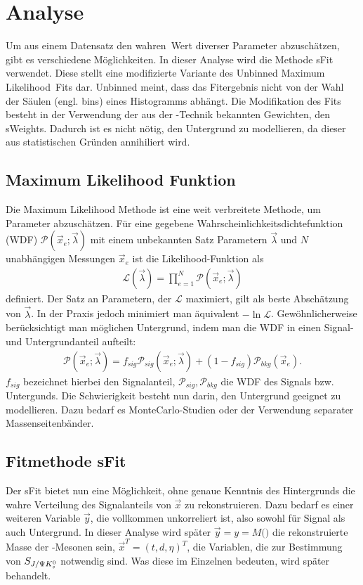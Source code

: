 \chapter{Analyse} \label{kap:analyse}
Um aus einem Datensatz den \glqq wahren\grqq\ Wert diverser Parameter abzuschätzen, gibt es verschiedene Möglichkeiten. In dieser Analyse wird die Methode sFit verwendet. Diese stellt eine modifizierte Variante des \glqq Unbinned Maximum Likelihood\grqq\ Fits dar. Unbinned meint, dass das Fitergebnis nicht von der Wahl der Säulen (engl. bins) eines Histogramms abhängt. Die Modifikation des Fits besteht in der Verwendung der aus der \SPlot-Technik bekannten Gewichten, den sWeights. Dadurch ist es nicht nötig, den Untergrund zu modellieren, da dieser aus statistischen Gründen annihiliert wird.

\section{Maximum Likelihood Funktion}
Die Maximum Likelihood Methode ist eine weit verbreitete Methode, um Parameter abzuschätzen. Für eine gegebene Wahrscheinlichkeitsdichtefunktion (WDF) $\mathcal{P}(\vec{x}_e;\vec{\lambda})$ mit einem unbekannten Satz Parametern $\vec{\lambda}$ und $N$ unabhängigen Messungen $\vec{x}_e$ ist die Likelihood-Funktion als
\begin{align}
\mathcal{L}(\vec{\lambda}) = \prod_{e=1}^N \mathcal{P}(\vec{x}_e;\vec{\lambda})
\end{align}
definiert. Der Satz an Parametern, der $\mathcal{L}$ maximiert, gilt als beste Abschätzung von $\vec{\lambda}$. In der Praxis jedoch minimiert man äquivalent $-\ln\mathcal{L}$. Gewöhnlicherweise berücksichtigt man möglichen Untergrund, indem man die WDF in einen Signal- und Untergrundanteil aufteilt:
\begin{align}
\mathcal{P}(\vec{x}_e;\vec{\lambda}) = f_{sig}\mathcal{P}_{sig}(\vec{x}_e;\vec{\lambda}) + (1-f_{sig})\mathcal{P}_{bkg}(\vec{x}_e). \label{eq:likelihood_sig_bkg}
\end{align}
$f_{sig}$ bezeichnet hierbei den Signalanteil, $\mathcal{P}_{sig}, \mathcal{P}_{bkg}$ die WDF des Signals bzw. Untergunds. Die Schwierigkeit besteht nun darin, den Untergrund geeignet zu modellieren. Dazu bedarf es MonteCarlo-Studien oder der Verwendung separater Massenseitenbänder. \cite{sfit}

\section{Fitmethode sFit} \label{kap:sfit}
Der sFit bietet nun eine Möglichkeit, ohne genaue Kenntnis des Hintergrunds die wahre Verteilung des Signalanteils von $\vec{x}$ zu rekonstruieren. Dazu bedarf es einer weiteren Variable $\vec{y}$, die vollkommen unkorreliert ist, also sowohl für Signal als auch Untergrund. In dieser Analyse wird später $\vec{y} = y = M($\Bd$)$ die rekonstruierte Masse der \Bd-Mesonen sein, $\vec{x}^T = (t,d,\eta)^T$, die Variablen, die zur Bestimmung von $S_{J/\Psi K_s^0}$ notwendig sind. Was diese im Einzelnen bedeuten, wird später behandelt.


